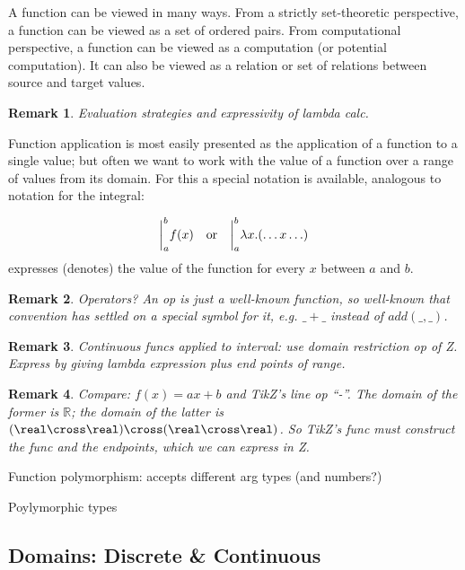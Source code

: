 \documentclass[12pt]{tufte-handout}
\numberwithin{equation}{subsection}
\numberwithin{equation}{subsection}
\newtheorem{remark}{Remark}
\newcommand\R{\(\mathds{R}\)}
\begin{document}
  A function can be viewed in many ways.  From a strictly set-theoretic
  perspective, a function can be viewed as a set of ordered pairs.  From
  computational perspective, a function can be viewed as a computation
  (or potential computation).  It can also be viewed as a relation or
  set of relations between source and target values.

  \begin{remark}
    Evaluation strategies and expressivity of lambda calc.
  \end{remark}

  Function application is most easily presented as the application of a
  function to a single value; but often we want to work with the value
  of a function over a range of values from its domain.  For this a
  special notation is available, analogous to notation for the integral:

  \[\bigg|_a^b f(x) \quad\textnormal{or}\quad\bigg|_a^b \lambda x.(\ldots x\ldots)\]
  \noindent expresses (denotes) the value of the function for every \(x\) between \(a\) and \(b\).

  \begin{remark}
    Operators?  An op is just a well-known function, so well-known that
    convention has settled on a special symbol for it, e.g. \(\_+\_\)
    instead of \(add(\_,\_)\).
  \end{remark}

  \begin{remark}
    Continuous funcs applied to interval: use domain restriction op of
    Z.  Express by giving lambda expression plus end points of range.
  \end{remark}

  \begin{remark}
    Compare: \(f(x) = ax + b\) and TikZ's line op ``-\-''.  The domain
    of the former is \R{}; the domain of the latter is
    \((\real\cross\real)\cross(\real\cross\real)\).  So TikZ's func must
    construct the func and the endpoints, which we can express in Z.
  \end{remark}

  Function polymorphism: accepts different arg types (and numbers?)

  Poylymorphic types

  \subsection{Domains: Discrete \& Continuous}
  \label{subs:}
\end{document}
